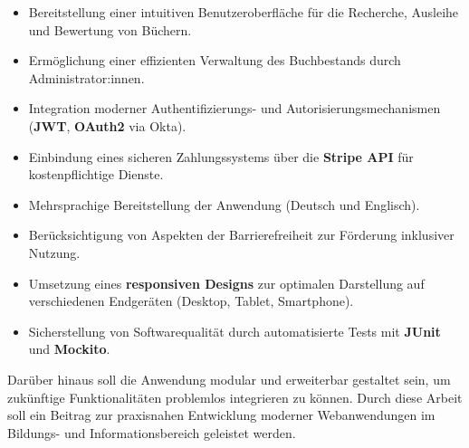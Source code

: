 \begin{itemize}
	\item Bereitstellung einer intuitiven Benutzeroberfläche für die Recherche, Ausleihe und Bewertung von Büchern.
	\item Ermöglichung einer effizienten Verwaltung des Buchbestands durch Administrator:innen.
	\item Integration moderner Authentifizierungs- und Autorisierungsmechanismen (\textbf{JWT}, \textbf{OAuth2} via Okta).
	\item Einbindung eines sicheren Zahlungssystems über die \textbf{Stripe API} für kostenpflichtige Dienste.
	\item Mehrsprachige Bereitstellung der Anwendung (Deutsch und Englisch).
	\item Berücksichtigung von Aspekten der Barrierefreiheit zur Förderung inklusiver Nutzung.
	\item Umsetzung eines \textbf{responsiven Designs} zur optimalen Darstellung auf verschiedenen Endgeräten (Desktop, Tablet, Smartphone).
	\item Sicherstellung von Softwarequalität durch automatisierte Tests mit \textbf{JUnit} und \textbf{Mockito}.  
\end{itemize}  

\noindent Darüber hinaus soll die Anwendung modular und erweiterbar gestaltet sein, um zukünftige Funktionalitäten problemlos integrieren zu können. Durch diese Arbeit soll ein Beitrag zur praxisnahen Entwicklung moderner Webanwendungen im Bildungs- und Informationsbereich geleistet werden.